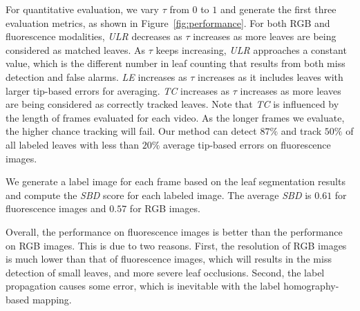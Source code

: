 For quantitative evaluation, we vary $\tau$ from $0$ to $1$ and generate the first three evaluation metrics, as shown in Figure~\ref{fig:performance}.
For both RGB and fluorescence modalities, {\it{ULR}} decreases as $\tau$ increases as more leaves are being considered as matched leaves.
As $\tau$ keeps increasing, {\it{ULR}} approaches a constant value, which is the different number in leaf counting that results from both miss detection and false alarms.
{\it{LE}} increases as $\tau$ increases as it includes leaves with larger tip-based errors for averaging.
{\it{TC}} increases as $\tau$ increases as more leaves are being considered as correctly tracked leaves.
Note that {\it{TC}} is influenced by the length of frames evaluated for each video.
As the longer frames we evaluate, the higher chance tracking will fail.
Our method can detect $87\%$ and track $50\%$ of all labeled leaves with less than $20\%$ average tip-based errors on fluorescence images. 

We generate a label image for each frame based on the leaf segmentation results and compute the {\it{SBD}} score for each labeled image.
The average {\it{SBD}} is $0.61$ for fluorescence images and $0.57$ for RGB images. 

Overall, the performance on fluorescence images is better than the performance on RGB images.
This is due to two reasons. 
First, the resolution of RGB images is much lower than that of fluorescence images, which will results in the miss detection of small leaves, and more severe leaf occlusions. 
Second, the label propagation causes some error, which is inevitable with the label homography-based mapping. 











